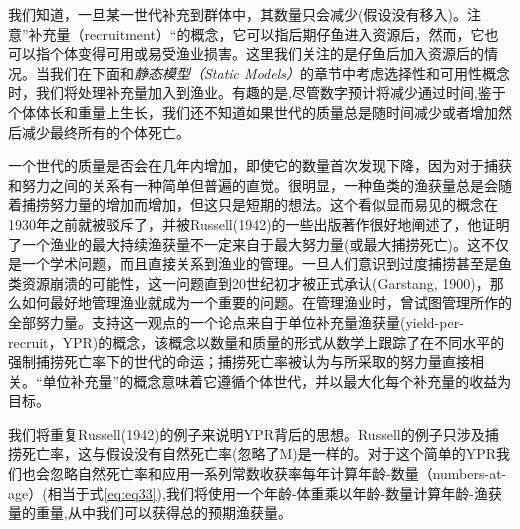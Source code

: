 \documentclass[
  lang=cn,
  11pt,
  scheme=chinese,
  chinesefont=nofont,
  citestyle=gb7714-2015,
  bibstyle=gb7714-2015]{elegantbook}
\begin{document}
我们知道，一旦某一世代补充到群体中，其数量只会减少(假设没有移入)。注意''补充量（recruitment）``的概念，它可以指后期仔鱼进入资源后，然而，它也可以指个体变得可用或易受渔业损害。这里我们关注的是仔鱼后加入资源后的情况。当我们在下面和\emph{静态模型（Static Models）}的章节中考虑选择性和可用性概念时，我们将处理补充量加入到渔业。有趣的是,尽管数字预计将减少通过时间,鉴于个体体长和重量上生长，我们还不知道如果世代的质量总是随时间减少或者增加然后减少最终所有的个体死亡。

一个世代的质量是否会在几年内增加，即使它的数量首次发现下降，因为对于捕获和努力之间的关系有一种简单但普遍的直觉。很明显，一种鱼类的渔获量总是会随着捕捞努力量的增加而增加，但这只是短期的想法。这个看似显而易见的概念在1930年之前就被驳斥了，并被Russell(1942)的一些出版著作很好地阐述了，他证明了一个渔业的最大持续渔获量不一定来自于最大努力量(或最大捕捞死亡)。这不仅是一个学术问题，而且直接关系到渔业的管理。一旦人们意识到过度捕捞甚至是鱼类资源崩溃的可能性，这一问题直到20世纪初才被正式承认(Garstang, 1900)，那么如何最好地管理渔业就成为一个重要的问题。在管理渔业时，曾试图管理所作的全部努力量。支持这一观点的一个论点来自于单位补充量渔获量(yield-per-recruit，YPR)的概念，该概念以数量和质量的形式从数学上跟踪了在不同水平的强制捕捞死亡率下的世代的命运；捕捞死亡率被认为与所采取的努力量直接相关。``单位补充量''的概念意味着它遵循个体世代，并以最大化每个补充量的收益为目标。

我们将重复Russell(1942)的例子来说明YPR背后的思想。Russell的例子只涉及捕捞死亡率，这与假设没有自然死亡率(忽略了M)是一样的。对于这个简单的YPR我们也会忽略自然死亡率和应用一系列常数收获率每年计算年龄-数量（numbers-at-age）(相当于式\eqref{eq:eq33}),我们将使用一个年龄-体重乘以年龄-数量计算年龄-渔获量的重量,从中我们可以获得总的预期渔获量。
\end{document}
